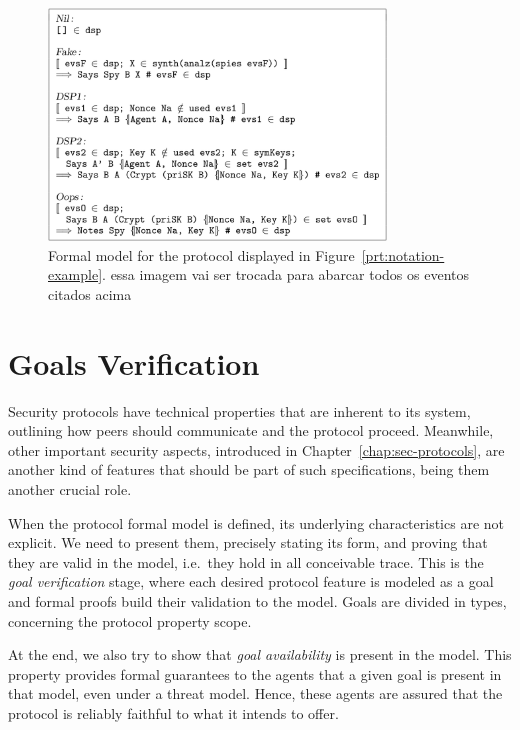 \begin{figure}\label{fig:notation-example-model}
  \centering
  \includegraphics[width=0.8\textwidth]{img/prt-example-model}
  \caption{Formal model for the protocol displayed in Figure~\ref{prt:notation-example}. {\color{blue} essa imagem vai ser trocada para abarcar todos os eventos citados acima}}
\end{figure}





\section{Goals Verification}
Security protocols have technical properties that are inherent to its system, outlining how peers should communicate and the protocol proceed. Meanwhile, other important security aspects, introduced in Chapter~\ref{chap:sec-protocols}, are another kind of features that should be part of such specifications, being them another crucial role.

When the protocol formal model is defined, its underlying characteristics are not explicit. We need to present them, precisely stating its form, and proving that they are valid in the model, i.e.\ they hold in all conceivable trace. This is the \textit{goal verification} stage, where each desired protocol feature is modeled as a goal and formal proofs build their validation to the model. Goals are divided in types, concerning the protocol property scope.

At the end, we also try to show that \textit{goal availability} is present in the model. This property provides formal guarantees to the agents that a given goal is present in that model, even under a threat model. Hence, these agents are assured that the protocol is reliably faithful to what it intends to offer.



